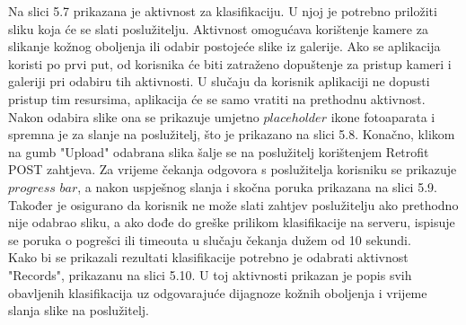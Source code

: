 \documentclass[times, utf8, zavrsni]{fer}
\begin{document}
Na slici 5.7 prikazana je aktivnost za klasifikaciju. U njoj je potrebno priložiti sliku koja će se slati poslužitelju. Aktivnost omogućava korištenje kamere za slikanje kožnog oboljenja ili odabir postojeće slike iz galerije. Ako se aplikacija koristi po prvi put, od korisnika će biti zatraženo dopuštenje za pristup kameri i galeriji pri odabiru tih aktivnosti. U slučaju da korisnik aplikaciji ne dopusti pristup tim resursima, aplikacija će se samo vratiti na prethodnu aktivnost. Nakon odabira slike ona se prikazuje umjetno $placeholder$ ikone fotoaparata i spremna je za slanje na poslužitelj, što je prikazano na slici 5.8. Konačno, klikom na gumb "Upload" odabrana slika šalje se na poslužitelj korištenjem Retrofit POST zahtjeva. Za vrijeme čekanja odgovora s poslužitelja korisniku se prikazuje $progress$ $bar$, a nakon uspješnog slanja i skočna poruka prikazana na slici 5.9. Također je osigurano da korisnik ne može slati zahtjev poslužitelju ako prethodno nije odabrao sliku, a ako dođe do greške prilikom klasifikacije na serveru, ispisuje se poruka o pogrešci ili timeouta u slučaju čekanja dužem od 10 sekundi.\\
%
\indent{}
Kako bi se prikazali rezultati klasifikacije potrebno je odabrati aktivnost "Records", prikazanu na slici 5.10. U toj aktivnosti prikazan je popis svih obavljenih klasifikacija uz odgovarajuće dijagnoze kožnih oboljenja i vrijeme slanja slike na poslužitelj.
\end{document}
